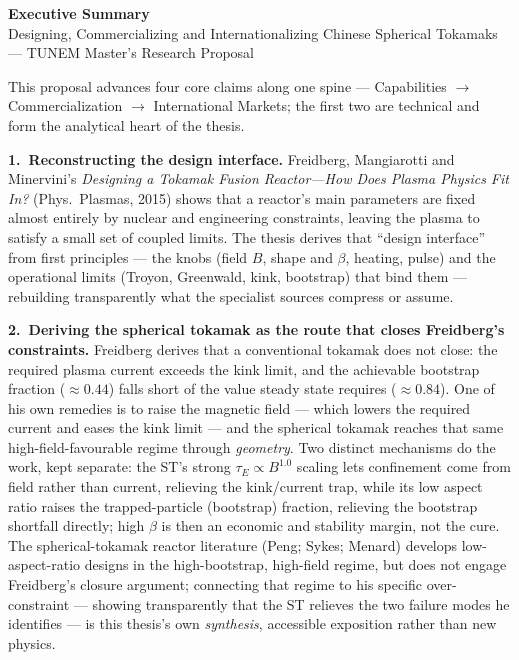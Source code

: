 \documentclass[11pt]{article}
\begin{document}
\clearpage

\renewcommand{\contentsname}{Table of Contents}
\tableofcontents
\clearpage

\begin{center}
{\large\textbf{Executive Summary}}\\[2pt]
{\small Designing, Commercializing and Internationalizing Chinese Spherical Tokamaks --- TUNEM Master's Research Proposal}
\end{center}
\vspace{2pt}

This proposal advances four core claims along one spine --- Capabilities $\rightarrow$ Commercialization $\rightarrow$ International Markets; the first two are technical and form the analytical heart of the thesis.

\textbf{1.~Reconstructing the design interface.} Freidberg, Mangiarotti and Minervini's \emph{Designing a Tokamak Fusion Reactor---How Does Plasma Physics Fit In?} (Phys.\ Plasmas, 2015) shows that a reactor's main parameters are fixed almost entirely by nuclear and engineering constraints, leaving the plasma to satisfy a small set of coupled limits. The thesis derives that ``design interface'' from first principles --- the knobs (field $B$, shape and $\beta$, heating, pulse) and the operational limits (Troyon, Greenwald, kink, bootstrap) that bind them --- rebuilding transparently what the specialist sources compress or assume.

\textbf{2.~Deriving the spherical tokamak as the route that closes Freidberg's constraints.} Freidberg derives that a conventional tokamak does not close: the required plasma current exceeds the kink limit, and the achievable bootstrap fraction ($\approx 0.44$) falls short of the value steady state requires ($\approx 0.84$). One of his own remedies is to raise the magnetic field --- which lowers the required current and eases the kink limit --- and the spherical tokamak reaches that same high-field-favourable regime through \emph{geometry}. Two distinct mechanisms do the work, kept separate: the ST's strong $\tau_E\propto B^{1.0}$ scaling lets confinement come from field rather than current, relieving the kink/current trap, while its low aspect ratio raises the trapped-particle (bootstrap) fraction, relieving the bootstrap shortfall directly; high $\beta$ is then an economic and stability margin, not the cure. The spherical-tokamak reactor literature (Peng; Sykes; Menard) develops low-aspect-ratio designs in the high-bootstrap, high-field regime, but does not engage Freidberg's closure argument; connecting that regime to his specific over-constraint --- showing transparently that the ST relieves the two failure modes he identifies --- is this thesis's own \emph{synthesis}, accessible exposition rather than new physics.
\end{document}

